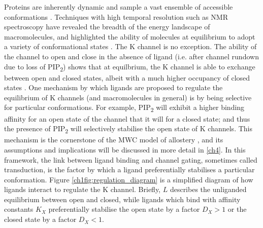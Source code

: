 Proteins are inherently dynamic and sample a vast ensemble of accessible conformations \cite{boehr_role_2009}.
Techniques with high temporal resolution such as NMR spectroscopy have revealed the breadth of the energy landscape of macromolecules, and highlighted the ability of molecules at equilibrium to adopt a variety of conformational states \cite{mittermaier_new_2006}.
The K\ATP{} channel is no exception.
The ability of the channel to open and close in the absence of ligand (i.e. after channel rundown due to loss of PIP\textsubscript{2}) shows that at equilbrium, the K\ATP{} channel is able to exchange between open and closed states, albeit with a much higher occupancy of closed states \cite{ribalet_regulation_2000, proks_running_2016-2}.
One mechanism by which ligands are proposed to regulate the equilibrium of K\ATP{} channels (and macromolecules in general) is by being selective for particular conformations.
For example, PIP\textsubscript{2} will exhibit a higher binding affinity for an open state of the channel that it will for a closed state; and thus the presence of PIP\textsubscript{2} will selectively stabilise the open state of K\ATP{} channels.
This mechanism is the cornerstone of the MWC model of allostery \cite{monod_nature_1965-1, rubin_nature_1966, garcia_chapter_2011, marzen_statistical_2013}, and its assumptions and implications will be discussed in more detail in \ref{ch4}.
In this framework, the link between ligand binding and channel gating, sometimes called transduction, is the factor by which a ligand preferentially stabilises a particular conformation.
Figure \ref{ch1fig:regulation_diagram} is a simplified diagram of how ligands interact to regulate the K\ATP{} channel.
Briefly, $L$ describes the unliganded equilibrium between open and closed, while ligands which bind with affinity constants $K_X$ preferentially stabilise the open state by a factor $D_X > 1$ or the closed state by a factor $D_X < 1$.

